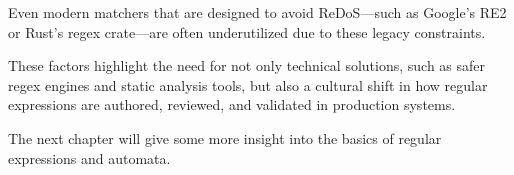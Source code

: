 Even modern matchers that are designed to avoid ReDoS—such as Google’s RE2 or Rust’s regex crate—are often underutilized due to these legacy constraints.

These factors highlight the need for not only technical solutions, such as safer regex engines and static analysis tools, but also a cultural shift in how regular expressions are authored, reviewed, and validated in production systems.

The next chapter will give some more insight into the basics of regular expressions and automata.

%

%	
%	
%	
%	
%	
%	


